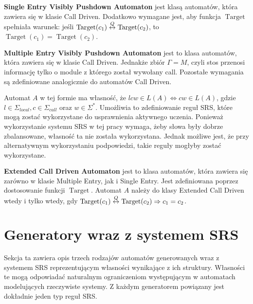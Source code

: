 \textbf{Single Entry Visibly Pushdown Automaton} jest klasą automatów, która zawiera się w klasie Call Driven. Dodatkowo wymagane
jest, aby funkcja $\operatorname{Target}$ spełniała warunek: jeśli $\operatorname{Target}(c_1) \mathrel{\overset{Q}{\leftrightarrow}} \operatorname{Target}(c_2)$, to $\operatorname{Target}(c_1) = \operatorname{Target}(c_2)$.

\textbf{Multiple Entry Visibly Pushdown Automaton} jest to klasa automatów, która zawiera się w klasie Call Driven.
Jednakże zbiór $\Gamma = M$, czyli stos przenosi informację tylko o module z którego został wywołany call.
Pozostałe wymagania są zdefiniowane analogicznie do automatów Call Driven.

Automat $A$ w tej formie ma własność, że $lcw \in L(A) \Leftrightarrow cw \in L(A)$, gdzie $l \in \Sigma_{local}, c \in \Sigma_{call}$
oraz $w \in \Sigma^*$. Umożliwia to zdefiniowanie reguł SRS, które mogą zostać wykorzystane do usprawnienia aktywnego uczenia.
Ponieważ wykorzystanie systemu SRS w tej pracy wymaga, żeby słowa były dobrze zbalansowane, własność ta nie została wykorzystana.
Jednak możliwe jest, że przy alternatywnym wykorzystaniu podpowiedzi, takie reguły mogłyby zostać wykorzystane.

\textbf{Extended Call Driven Automaton} jest to klasa automatów, która zawiera się zarówno w klasie Multiple Entry, jak i Single Entry.
Jest zdefiniowana poprzez dostosowanie funkcji $\operatorname{Target}$. Automat $A$ należy do klasy Extended Call Driven
wtedy i tylko wtedy, gdy $\operatorname{Target}(c_1) \mathrel{\overset{Q}{\leftrightarrow}} \operatorname{Target}(c_2) \Rightarrow c_1 = c_2$.

\section{Generatory wraz z systemem SRS}
\label{chap:generatorsSrs}

Sekcja ta zawiera opis trzech rodzajów automatów generowanych wraz z systemem SRS reprezentującym własności wynikające
z ich struktury. Własności te mogą odpowiadać naturalnym ograniczeniom występującym w automatach modelujących rzeczywiste
systemy. Z każdym generatorem powiązany jest dokładnie jeden typ reguł SRS.

